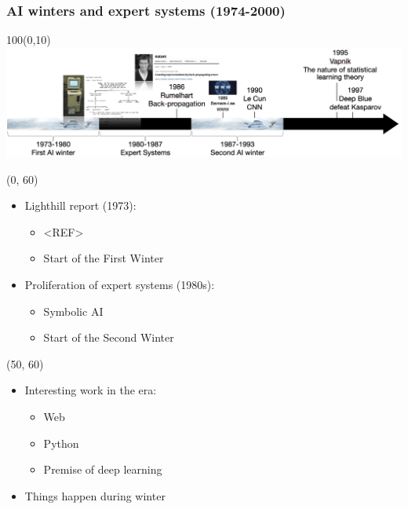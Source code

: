 \begin{frame}
  \frametitle{AI winters and expert systems (1974-2000)}

  \begin{textblock}{100}(0,10)
    \includegraphics[width=\textwidth]{img/ai_history_1974_2000.png}
  \end{textblock}

  \begin{textblock}{50}(0, 60)
    \begin{itemize}
      \item Lighthill report (1973):
      \begin{itemize}
      \item <REF>
      \item Start of the First Winter
      \end{itemize}
      \item Proliferation of expert systems (1980s):
      \begin{itemize}
      \item Symbolic AI
      \item Start of the Second Winter
      \end{itemize}
    \end{itemize}
  \end{textblock}

  \begin{textblock}{50}(50, 60)
    \begin{itemize}
      \item Interesting work in the era:
      \begin{itemize}
      \item Web
      \item Python
      \item Premise of deep learning
      \end{itemize}
      \item Things happen during winter
    \end{itemize}
  \end{textblock}

\end{frame}



